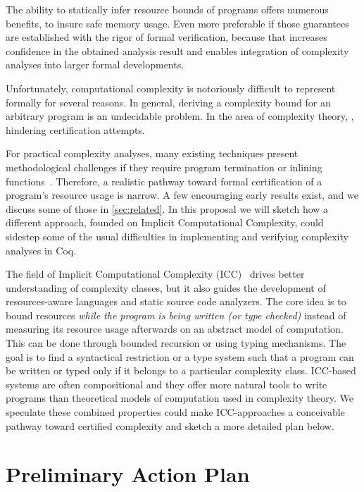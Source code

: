 \documentclass[sigplan,screen,timestamp,%
nonacm]{acmart}
\begin{document}
The ability to statically infer resource bounds of programs offers numerous benefits, \eg 
to insure safe memory usage.
Even more preferable if those guarantees are established with the rigor of formal verification,
because that increases confidence in the obtained analysis result and enables integration of complexity
analyses into larger formal developments.

Unfortunately, computational complexity is notoriously difficult to represent formally for several reasons.
In general, deriving a complexity bound for an arbitrary program is an undecidable problem. %
In the area of complexity theory, , hindering certification attempts.

For practical complexity analyses, many existing techniques present methodological challenges if they require \eg program termination or inlining functions~\cite{carbonneaux2015}.
Therefore, a realistic pathway toward formal certification of a program's resource usage is narrow.
A few encouraging early results exist, and we discuss some of those in \autoref{sec:related}.
In this proposal we will sketch how a different approach, founded on Implicit Computational Complexity,
could sidestep some of the usual difficulties in implementing and verifying complexity analyses in Coq.

The field of Implicit Computational Complexity (ICC)~\cite{DalLago2012a} drives better understanding of complexity classes, but it
also guides the development of resources-aware languages and static source code analyzers.
The core idea is to bound resources \emph{while the program is being written (or type checked)} instead of measuring its resource usage afterwards on an abstract model of computation.
This can be done through \eg bounded recursion or using typing mechanisms.
The goal is to find a syntactical restriction or a type system such that a program can be written or typed only if it belongs to a particular complexity class.
ICC-based systems are often compositional and they offer more natural tools to write programs than theoretical models of computation used in complexity theory.
We speculate these combined properties could make ICC-approaches a conceivable pathway toward certified complexity and sketch a more detailed plan below.

\section{Preliminary Action Plan}  %
\label{sec:plans}
\end{document}
